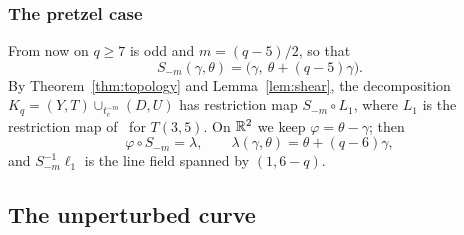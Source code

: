 \subsubsection*{The pretzel case}
From now on $q\ge7$ is odd and $m=(q-5)/2$, so that
\[
S_{-m}(\gamma,\theta)=\bigl(\gamma,\ \theta+(q-5)\gamma\bigr).
\]
By Theorem~\ref{thm:topology} and Lemma~\ref{lem:shear}, the decomposition $K_q=(Y,T)\cup_{t_e^{-m}}(D,U)$ has restriction
map $S_{-m}\circ L_1$, where $L_1$ is the restriction map of~\cite{WuebbenV} for $T(3,5)$. On $\mathbb{R}^2$ we keep
$\varphi=\theta-\gamma$; then
\[
\varphi\circ S_{-m}=\lambda,\qquad \lambda(\gamma,\theta)=\theta+(q-6)\gamma ,
\]
and $S_{-m}^{-1}\ell_1$ is the line field spanned by $(1,6-q)$.

\subsection{The unperturbed curve}\label{ss:straight}


